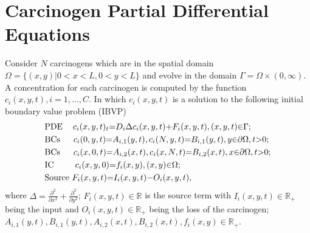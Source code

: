\documentclass[\main/thesis.tex]{subfiles}
\begin{document}
	
\section{Carcinogen Partial Differential Equations}

Consider $N$ carcinogens which are in the spatial domain \newline
$\Omega {=} \{ (x, y) | 0 {<} x {<} L, 0 {<} y {<} L \}$ and evolve in the 
domain $\Gamma {=} \Omega {\times} (0, \infty)$. \newline
A concentration for each carcinogen is computed by the function \newline
$c_i(x, y, t), i {=} 1, ..., C$. In which $c_i(x, y, t)$ is a solution to the 
following initial boundary value problem (IBVP)
\begin{align}
	&\text{PDE }    \hspace{0.12in} c_i(x, y, t)_t {=} D_i \Delta c_i(x, y, t)
	                                               {+} F_i(x, y, t),
	                                (x, y, t) {\in} \Gamma;
	                                \label{eq:carcin_pde_inhomo} \\
	&\text{BCs }    \hspace{0.17in} c_i(0, y, t)   {=} A_{i,1}(y, t),
	                                c_i(N, y, t)   {=} B_{i,1}(y, t),
	                                y {\in} \partial \Omega, t {>} 0;
	                                \label{eq:bcs_inhomo_x} \\
	&\text{BCs }    \hspace{0.17in} c_i(x, 0, t)   {=} A_{i,2}(x, t),
	                                c_i(x, N, t)   {=} B_{i,2}(x, t),
	                                x {\in} \partial \Omega, t {>} 0;
	                                \label{eq:bcs_inhomo_y} \\
	&\text{IC }     \hspace{0.30in} c_i(x, y, 0)   {=} f_i(x, y),
	                                (x, y) {\in} \Omega;
	                                \label{eq:ic_inhomo} \\
	&\text{Source }                 F_i(x, y, t)   {=} I_i(x, y, t)
	                                               {-} O_i(x, y, t),
	                                \label{eq:source_term}
\end{align}
where
$
\Delta {=} \frac{\partial^2}
                {\partial x^2}
       {+} \frac{\partial^2}
                {\partial y^2}
$;
$F_i(x, y, t) {\in} \mathbb{R}$ is the source term with
$I_i(x, y, t) {\in} \mathbb{R}_+$ being the input and
$O_i(x, y, t) {\in} \mathbb{R}_+$ being the loss of the carcinogen; \newline
$
A_{i,1}(y, t), B_{i,1}(y, t),
A_{i,2}(x, t), B_{i,2}(x, t),
f_i(x, y) {\in} \mathbb{R}_+
$. 
\end{document}
